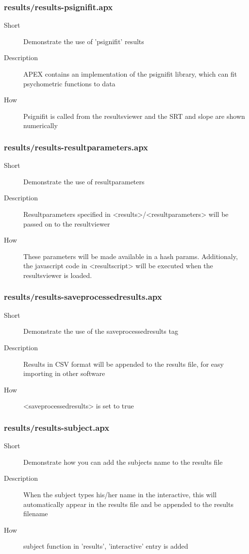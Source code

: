 \subsubsection{results/results-psignifit.apx}
\begin{description}
\item[Short] 
 Demonstrate the use of 'psignifit' results
\item[Description] 
 APEX contains an implementation of the psignifit library, which can fit psychometric functions to data
\item[How] 
 Psignifit is called from the resultsviewer and the SRT and slope are shown numerically
\end{description}

\subsubsection{results/results-resultparameters.apx}
\begin{description}
\item[Short] 
 Demonstrate the use of resultparameters
\item[Description] 
 Resultparameters specified in \textless{}results\textgreater{}/\textless{}resultparameters\textgreater{} will be passed on to the resultviewer
\item[How] 
 These parameters will be made available in a hash params. Additionaly, the javascript code in \textless{}resultscript\textgreater{} will be executed when the resultsviewer is loaded.
\end{description}

\subsubsection{results/results-saveprocessedresults.apx}
\begin{description}
\item[Short] 
 Demonstrate the use of the saveprocessedresults tag
\item[Description] 
 Results in CSV format will be appended to the results file, for easy importing in other software
\item[How] 
 \textless{}saveprocessedresults\textgreater{} is set to true
\end{description}

\subsubsection{results/results-subject.apx}
\begin{description}
\item[Short] 
 Demonstrate how you can add the subjects name to the results file
\item[Description] 
 When the subject types his/her name in the interactive, this will automatically appear in the results file and be appended to the results filename
\item[How] 
 subject function in 'results', 'interactive' entry is added
\end{description}

